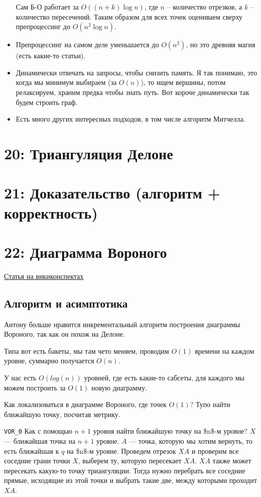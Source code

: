 \documentclass[11pt]{article}
\begin{document}
\begin{itemize}
Сам Б-О работает за \(O((n+k)\log{n})\), где \(n\) -- количество
отрезков, а \(k\) -- количество пересечений.  Таким образом для всех
точек оцениваем сверху препроцессинг до \(O(n^2\log{n})\).
\item Препроцессинг на самом деле уменьшается до \(O(n^2)\), но это
древняя магия (есть какие-то статьи).
\item Динамически отвечать на запросы, чтобы снизить память. Я так
понимаю, это когда мы минимум выбираем (за \(O(n)\)), то ищем
вершины, потом релаксируем, храним предка чтобы знать путь. Вот
короче динамически так будем строить граф.
\item Есть много других интересных подходов, в том числе алгоритм
Митчелла.
\end{itemize}
\section{{\bfseries{}} 20: Триангуляция Делоне}
\label{sec:orgheadline50}
\section{{\bfseries{}} 21: Доказательство (алгоритм + корректность)}
\label{sec:orgheadline51}
\section{{\bfseries{}} 22: Диаграмма Вороного}
\label{sec:orgheadline58}
\href{http://neerc.ifmo.ru/wiki/index.php?title=Диаграмма_Вороного}{Статья на викиконспектах}
\subsection{Алгоритм и асимптотика}
\label{sec:orgheadline52}
Антону больше нравится инкрементальный алгоритм построения диаграммы
Вороного, так как он похож на Делоне.

Типа вот есть бакеты, мы там чето меняем, проводим \(O(1)\) времени на
каждом уровне, суммарно получается \(O(n)\).

У нас есть \(O(log(n))\) уровней, где есть какие-то сабсеты, для
каждого мы можем построить за \(O(1)\) новую диаграмму.

Как локализоваться в диаграмме Вороного, где точек \(O(1)\)? Тупо
найти ближайшую точку, посчитав метрику.

\texttt{VOR\_0}
Как с помощью \(n+1\) уровня найти ближайшую точку на \$n\$-м уровне?
\(X\) --- ближайшая точка на \(n+1\) уровне. \(A\) --- точка, которую мы хотим
вернуть, то есть ближайшая к \(q\) на \$n\$-м уровне. Проведем отрезок \(XA\) и
проверим все соседние грани точки \(X\), выберем ту, которую пересекает
\(XA\). \(XA\) также может пересекать какую-то точку триангуляции. Тогда
нужно перебрать все соседние прямые, исходящие из этой точки и
выбрать такие две, между которыми проходит \(XA\).
\end{document}
